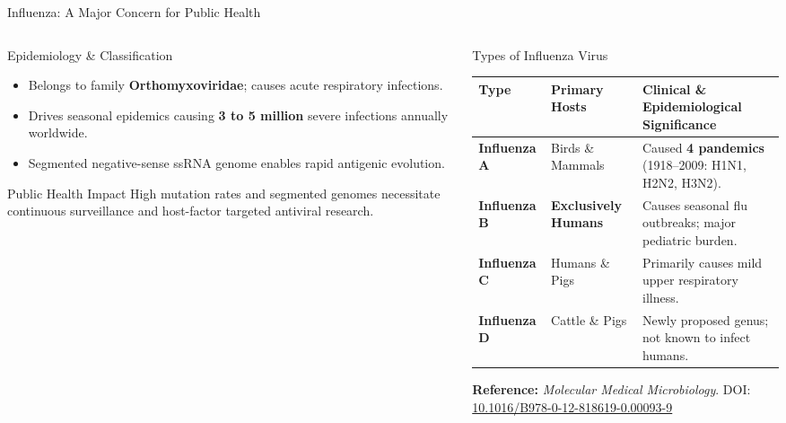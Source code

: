 \documentclass[aspectratio=169, 10pt]{beamer}
\begin{document}
\begin{frame}{Influenza: A Major Concern for Public Health}
  \begin{columns}[T]
    \begin{column}{0.41\textwidth}
      \begin{block}{Epidemiology \& Classification}
        \small
        \begin{itemize}
          \item Belongs to family \textbf{Orthomyxoviridae}; causes acute respiratory infections.
          \item Drives seasonal epidemics causing \textbf{3 to 5 million} severe infections annually worldwide.
          \item Segmented negative-sense ssRNA genome enables rapid antigenic evolution.
        \end{itemize}
      \end{block}
      \vspace{0.15cm}
      \begin{alertblock}{Public Health Impact}
        \footnotesize High mutation rates and segmented genomes necessitate continuous surveillance and host-factor targeted antiviral research.
      \end{alertblock}
    \end{column}

    \begin{column}{0.56\textwidth}
      \begin{block}{Types of Influenza Virus}
        \renewcommand{\arraystretch}{1.2}
        \footnotesize
        \begin{tabularx}{\linewidth}{@{}l l X@{}}
          \toprule
          \textbf{Type} & \textbf{Primary Hosts} & \textbf{Clinical \& Epidemiological Significance} \\
          \midrule
          \textbf{Influenza A} & Birds \& Mammals & Caused \textbf{4 pandemics} (1918--2009: H1N1, H2N2, H3N2). \\
          \textbf{Influenza B} & \textbf{Exclusively Humans} & Causes seasonal flu outbreaks; major pediatric burden. \\
          \textbf{Influenza C} & Humans \& Pigs & Primarily causes mild upper respiratory illness. \\
          \textbf{Influenza D} & Cattle \& Pigs & Newly proposed genus; not known to infect humans. \\
          \bottomrule
        \end{tabularx}
      \end{block}
      \vspace{0.15cm}
      {\scriptsize\color{textmuted}\textbf{Reference:} \textit{Molecular Medical Microbiology}. DOI: \href{https://doi.org/10.1016/B978-0-12-818619-0.00093-9}{10.1016/B978-0-12-818619-0.00093-9}}
    \end{column}
  \end{columns}
\end{frame}
\end{document}
